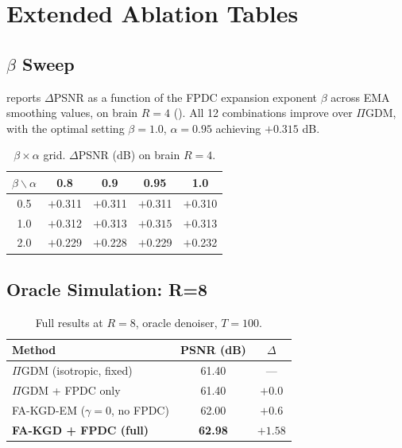 \documentclass[conference]{IEEEtran}
\newcommand{\PIGDM}{$\Pi$GDM}
\begin{document}



\appendix

\section{Extended Ablation Tables}
\label{app:ablations}

\subsection{$\beta$ Sweep}

 reports $\Delta$PSNR as a function of the FPDC
expansion exponent $\beta$ across EMA smoothing values, on brain $R=4$
(). All 12 combinations improve over \PIGDM{}, with
the optimal setting $\beta=1.0$, $\alpha=0.95$ achieving $+0.315$ dB.

\begin{table}[h]
\centering
\caption{$\beta \times \alpha$ grid. $\Delta$PSNR (dB) on brain $R=4$.}
\label{tab:beta}
\begin{tabular}{ccccc}
\toprule
$\beta \backslash \alpha$ & 0.8 & 0.9 & 0.95 & 1.0 \\
\midrule
0.5 & $+$0.311 & $+$0.311 & $+$0.311 & $+$0.310 \\
1.0 & $+$0.312 & $+$0.313 & $\mathbf{+0.315}$ & $+$0.313 \\
2.0 & $+$0.229 & $+$0.228 & $+$0.229 & $+$0.232 \\
\bottomrule
\end{tabular}
\end{table}

\subsection{Oracle Simulation: R=8}

\begin{table}[h]
\centering
\caption{Full results at $R=8$, oracle denoiser, $T=100$.}
\label{tab:r8}
\begin{tabular}{lcc}
\toprule
\textbf{Method} & \textbf{PSNR (dB)} & \textbf{$\Delta$} \\
\midrule
\PIGDM{} (isotropic, fixed) & 61.40 & — \\
\PIGDM{} + FPDC only & 61.40 & $+$0.0 \\
FA-KGD-EM ($\gamma{=}0$, no FPDC) & 62.00 & $+$0.6 \\
\textbf{FA-KGD + FPDC (full)} & \textbf{62.98} & $\mathbf{+1.58}$ \\
\bottomrule
\end{tabular}
\end{table}
\end{document}
